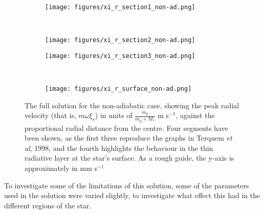 \documentclass[11pt]{amsart}
\begin{document}
\begin{sidewaysfigure}[htbp]
\begin{center}
\begin{subfigure}{0.5\textheight}
\texttt{[image: figures/xi\_r\_section1\_non-ad.png]}
\end{subfigure}
~
\begin{subfigure}{0.5\textheight}
\texttt{[image: figures/xi\_r\_section2\_non-ad.png]}
\end{subfigure}

\begin{subfigure}{0.5\textheight}
\texttt{[image: figures/xi\_r\_section3\_non-ad.png]}
\end{subfigure}
~
\begin{subfigure}{0.5\textheight}
\texttt{[image: figures/xi\_r\_surface\_non-ad.png]}
\end{subfigure}

\caption{The full solution for the non-adiabatic case, showing the peak radial velocity (that is, $m \omega \xi_{r}$) in units of $\frac{m_{p}}{m_{p} + M_{*}}$ m s$^{-1}$, against the proportional radial distance from the centre.  Four segments have been shown, as the first three reproduce the graphs in Terquem \textit{et al}, 1998, and the fourth highlights the behaviour in the thin radiative layer at the star's surface.  As a rough guide, the y-axis is approximately in mm s$^{-1}$}
\label{fig:non-ad}
\end{center}
\end{sidewaysfigure}



To investigate some of the limitations of this solution, some of the parameters used in the solution were varied slightly, to investigate what effect this had in the different regions of the star.
\end{document}

